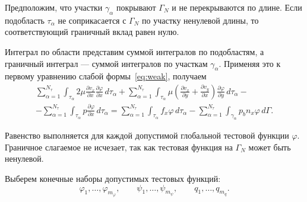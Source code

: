 \documentclass[a4paper,14pt]{extarticle}
\begin{document}
Предположим, что участки $\gamma_\alpha$ покрывают $\Gamma_N$
и не перекрываются по длине. Если подобласть $\tau_\alpha$
не соприкасается с $\Gamma_N$ по участку ненулевой длины,
то соответствующий граничный вклад равен нулю.

Интеграл по области представим суммой интегралов по подобластям,
а граничный интеграл --- суммой интегралов по участкам
$\gamma_\alpha$. Применяя это к первому уравнению слабой
формы~\eqref{eq:weak}, получаем
\begin{equation}
	\begin{gathered}
		\sum_{\alpha=1}^{N_\tau}
		\int_{\tau_\alpha}
		2\mu
		\frac{\partial v_x}{\partial x}
		\frac{\partial\varphi}{\partial x}
		\,d\tau_\alpha
		+
		\sum_{\alpha=1}^{N_\tau}
		\int_{\tau_\alpha}
		\mu\left(
			\frac{\partial v_x}{\partial y}
			+
			\frac{\partial v_y}{\partial x}
		\right)
		\frac{\partial\varphi}{\partial y}
		\,d\tau_\alpha
		-\\[6pt]
		-
		\sum_{\alpha=1}^{N_\tau}
		\int_{\tau_\alpha}
		p\frac{\partial\varphi}{\partial x}
		\,d\tau_\alpha
		=
		\sum_{\alpha=1}^{N_\tau}
		\int_{\tau_\alpha}
		f_x\varphi\,d\tau_\alpha
		-
		\sum_{\alpha=1}^{N_\tau}
		\int_{\gamma_\alpha}
		p_b n_x\varphi\,d\Gamma.
	\end{gathered}
	\label{eq:parts_first}
\end{equation}

Равенство выполняется для каждой допустимой глобальной
тестовой функции $\varphi$. Граничное слагаемое не исчезает,
так как тестовая функция на $\Gamma_N$ может быть ненулевой.

Выберем конечные наборы допустимых тестовых функций:
\begin{equation}
	\varphi_1,\ldots,\varphi_{m_\varphi},\qquad
	\psi_1,\ldots,\psi_{m_\psi},\qquad
	q_1,\ldots,q_{m_q}.
\end{equation}
\end{document}
